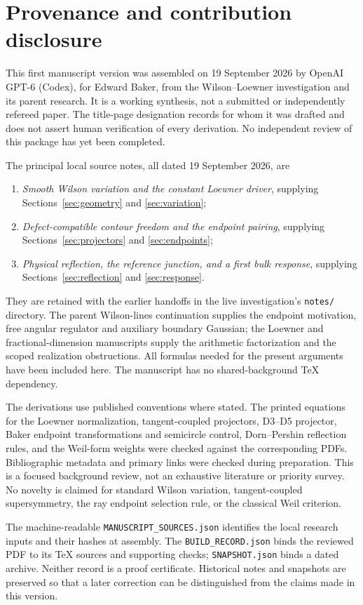 \section{Provenance and contribution disclosure}\label{app:provenance}

This first manuscript version was assembled on 19 September 2026
by OpenAI GPT-6 (Codex), for Edward Baker, from the Wilson--Loewner
investigation and its parent research. It is a working synthesis,
not a submitted or independently refereed paper. The title-page
designation records for whom it was drafted and does not assert
human verification of every derivation. No independent review of
this package has yet been completed.

The principal local source notes, all dated 19 September 2026, are
\begin{enumerate}
 \item \emph{Smooth Wilson variation and the constant Loewner driver},
 supplying Sections~\ref{sec:geometry} and \ref{sec:variation};
 \item \emph{Defect-compatible contour freedom and the endpoint pairing},
 supplying Sections~\ref{sec:projectors} and \ref{sec:endpoints};
 \item \emph{Physical reflection, the reference junction, and a first
 bulk response}, supplying Sections~\ref{sec:reflection} and
 \ref{sec:response}.
\end{enumerate}
They are retained with the earlier handoffs in the live investigation's
\texttt{notes/} directory. The parent Wilson-lines continuation supplies
the endpoint motivation, free angular regulator and auxiliary boundary
Gaussian; the Loewner and fractional-dimension manuscripts supply
the arithmetic factorization and the scoped realization obstructions.
All formulas needed for the present arguments have been included
here. The manuscript has no shared-background TeX dependency.

The derivations use published conventions where stated. The printed
equations for the Loewner normalization, tangent-coupled projectors,
D3--D5 projector, Baker endpoint transformations and semicircle
control, Dorn--Pershin reflection rules, and the Weil-form weights
were checked against the corresponding PDFs. Bibliographic metadata
and primary links were checked during preparation. This is a focused
background review, not an exhaustive literature or priority survey.
No novelty is claimed for standard Wilson variation, tangent-coupled
supersymmetry, the ray endpoint selection rule, or the classical
Weil criterion.

The machine-readable \nolinkurl{MANUSCRIPT_SOURCES.json} identifies
the local research inputs and their hashes at assembly. The
\nolinkurl{BUILD_RECORD.json} binds the reviewed PDF to its TeX
sources and supporting checks; \nolinkurl{SNAPSHOT.json} binds a
dated archive. Neither record is a proof certificate. Historical
notes and snapshots are preserved so that a later correction can
be distinguished from the claims made in this version.
